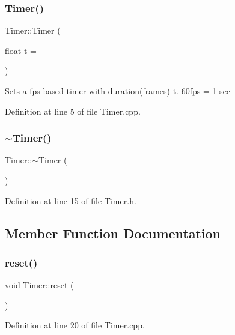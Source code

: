 \subsubsection{\texorpdfstring{Timer()}{Timer()}}
{\footnotesize\ttfamily Timer\+::\+Timer (\begin{DoxyParamCaption}\item[{float}]{t = {} }\end{DoxyParamCaption})}

Sets a fps based timer with duration(frames) t. 60fps = 1 sec 

Definition at line 5 of file Timer.\+cpp.

\mbox{\label{struct_timer_a14fa469c4c295c5fa6e66a4ad1092146}} 
\subsubsection{\texorpdfstring{$\sim$\+Timer()}{~Timer()}}
{\footnotesize\ttfamily Timer\+::$\sim$\+Timer (\begin{DoxyParamCaption}{ }\end{DoxyParamCaption})\hspace{0.3cm}{\ttfamily [inline]}}



Definition at line 15 of file Timer.\+h.



\subsection{Member Function Documentation}
\mbox{\label{struct_timer_a9020542d73357a4eef512eefaf57524b}} 
\subsubsection{\texorpdfstring{reset()}{reset()}}
{\footnotesize\ttfamily void Timer\+::reset (\begin{DoxyParamCaption}{ }\end{DoxyParamCaption})}



Definition at line 20 of file Timer.\+cpp.

\mbox{\label{struct_timer_a745ad59b5a46744cd871a1129a25d74f}} 
